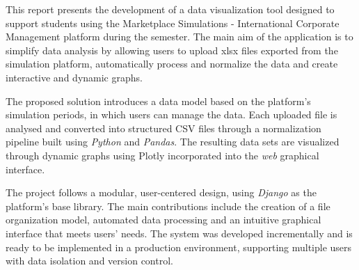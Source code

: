 This report presents the development of a data visualization tool designed to support students using the Marketplace Simulations - International Corporate Management platform during the semester. The main aim of the application is to simplify data analysis by allowing users to upload \gls{xlsx} files exported from the simulation platform, automatically process and normalize the data and create interactive and dynamic graphs.

The proposed solution introduces a data model based on the platform's simulation periods, in which users can manage the data. Each uploaded file is analysed and converted into structured CSV files through a normalization pipeline built using \textit{Python} and \textit{Pandas}. The resulting data sets are visualized through dynamic graphs using Plotly incorporated into the \textit{web} graphical interface.

The project follows a modular, user-centered design, using \textit{Django} as the platform's base library. The main contributions include the creation of a file organization model, automated data processing and an intuitive graphical interface that meets users' needs. The system was developed incrementally and is ready to be implemented in a production environment, supporting multiple users with data isolation and version control.